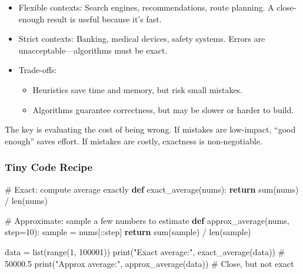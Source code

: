 \documentclass[
  letterpaper,
  DIV=11,
  numbers=noendperiod]{scrreprt}
\newenvironment{Shaded}{\begin{snugshade}}{\end{snugshade}}
\newcommand{\BuiltInTok}[1]{\textcolor[rgb]{0.00,0.23,0.31}{#1}}
\newcommand{\CommentTok}[1]{\textcolor[rgb]{0.37,0.37,0.37}{#1}}
\newcommand{\ControlFlowTok}[1]{\textcolor[rgb]{0.00,0.23,0.31}{\textbf{#1}}}
\newcommand{\DecValTok}[1]{\textcolor[rgb]{0.68,0.00,0.00}{#1}}
\newcommand{\KeywordTok}[1]{\textcolor[rgb]{0.00,0.23,0.31}{\textbf{#1}}}
\newcommand{\NormalTok}[1]{\textcolor[rgb]{0.00,0.23,0.31}{#1}}
\newcommand{\OperatorTok}[1]{\textcolor[rgb]{0.37,0.37,0.37}{#1}}
\newcommand{\StringTok}[1]{\textcolor[rgb]{0.13,0.47,0.30}{#1}}
\providecommand{\tightlist}{%
  \setlength{\itemsep}{0pt}\setlength{\parskip}{0pt}}
\begin{document}
\begin{itemize}
\item
  Flexible contexts: Search engines, recommendations, route planning. A
  close-enough result is useful because it's fast.
\item
  Strict contexts: Banking, medical devices, safety systems. Errors are
  unacceptable---algorithms must be exact.
\item
  Trade-offs:

  \begin{itemize}
  \tightlist
  \item
    Heuristics save time and memory, but risk small mistakes.
  \item
    Algorithms guarantee correctness, but may be slower or harder to
    build.
  \end{itemize}
\end{itemize}

The key is evaluating the cost of being wrong. If mistakes are
low-impact, ``good enough'' saves effort. If mistakes are costly,
exactness is non-negotiable.

\subsubsection{Tiny Code Recipe}\label{tiny-code-recipe-87}

\begin{Shaded}
\begin{Highlighting}[]
\CommentTok{\# Exact: compute average exactly}
\KeywordTok{def}\NormalTok{ exact\_average(nums):}
    \ControlFlowTok{return} \BuiltInTok{sum}\NormalTok{(nums) }\OperatorTok{/} \BuiltInTok{len}\NormalTok{(nums)}

\CommentTok{\# Approximate: sample a few numbers to estimate}
\KeywordTok{def}\NormalTok{ approx\_average(nums, step}\OperatorTok{=}\DecValTok{10}\NormalTok{):}
\NormalTok{    sample }\OperatorTok{=}\NormalTok{ nums[::step]}
    \ControlFlowTok{return} \BuiltInTok{sum}\NormalTok{(sample) }\OperatorTok{/} \BuiltInTok{len}\NormalTok{(sample)}

\NormalTok{data }\OperatorTok{=} \BuiltInTok{list}\NormalTok{(}\BuiltInTok{range}\NormalTok{(}\DecValTok{1}\NormalTok{, }\DecValTok{100001}\NormalTok{))}
\BuiltInTok{print}\NormalTok{(}\StringTok{"Exact average:"}\NormalTok{, exact\_average(data))     }\CommentTok{\# 50000.5}
\BuiltInTok{print}\NormalTok{(}\StringTok{"Approx average:"}\NormalTok{, approx\_average(data))   }\CommentTok{\# Close, but not exact}
\end{Highlighting}
\end{Shaded}
\end{document}

